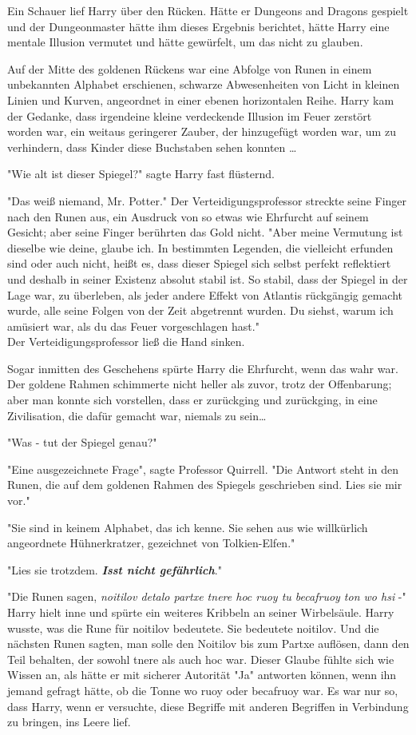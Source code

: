 {Ein Schauer lief Harry über den Rücken. Hätte er Dungeons and Dragons gespielt und der Dungeonmaster hätte ihm dieses Ergebnis berichtet, hätte Harry eine mentale Illusion vermutet und hätte gewürfelt, um das nicht zu glauben.

Auf der Mitte des goldenen Rückens war eine Abfolge von Runen in einem unbekannten Alphabet erschienen, schwarze Abwesenheiten von Licht in kleinen Linien und Kurven, angeordnet in einer ebenen horizontalen Reihe. Harry kam der Gedanke, dass irgendeine kleine verdeckende Illusion im Feuer zerstört worden war, ein weitaus geringerer Zauber, der hinzugefügt worden war, um zu verhindern, dass Kinder diese Buchstaben sehen konnten …

"Wie alt ist dieser Spiegel?" sagte Harry fast flüsternd.

"Das weiß niemand, Mr. Potter." Der Verteidigungsprofessor streckte seine Finger nach den Runen aus, ein Ausdruck von so etwas wie Ehrfurcht auf seinem Gesicht; aber seine Finger berührten das Gold nicht. "Aber meine Vermutung ist dieselbe wie deine, glaube ich. In bestimmten Legenden, die vielleicht erfunden sind oder auch nicht, heißt es, dass dieser Spiegel sich selbst perfekt reflektiert und deshalb in seiner Existenz absolut stabil ist. So stabil, dass der Spiegel in der Lage war, zu überleben, als jeder andere Effekt von Atlantis rückgängig gemacht wurde, alle seine Folgen von der Zeit abgetrennt wurden. Du siehst, warum ich amüsiert war, als du das Feuer vorgeschlagen hast."\\ Der Verteidigungsprofessor ließ die Hand sinken.

Sogar inmitten des Geschehens spürte Harry die Ehrfurcht, wenn das wahr war. Der goldene Rahmen schimmerte nicht heller als zuvor, trotz der Offenbarung; aber man konnte sich vorstellen, dass er zurückging und zurückging, in eine Zivilisation, die dafür gemacht war, niemals zu sein…

"Was - tut der Spiegel genau?"

"Eine ausgezeichnete Frage", sagte Professor Quirrell. "Die Antwort steht in den Runen, die auf dem goldenen Rahmen des Spiegels geschrieben sind. Lies sie mir vor."

"Sie sind in keinem Alphabet, das ich kenne. Sie sehen aus wie willkürlich angeordnete Hühnerkratzer, gezeichnet von Tolkien-Elfen."

"Lies sie trotzdem. \textbf{\emph{Isst nicht gefährlich}}."

"Die Runen sagen, \emph{noitilov detalo partxe tnere hoc ruoy tu becafruoy ton wo hsi} -" Harry hielt inne und spürte ein weiteres Kribbeln an seiner Wirbelsäule. Harry wusste, was die Rune für noitilov bedeutete. Sie bedeutete noitilov. Und die nächsten Runen sagten, man solle den Noitilov bis zum Partxe auflösen, dann den Teil behalten, der sowohl tnere als auch hoc war. Dieser Glaube fühlte sich wie Wissen an, als hätte er mit sicherer Autorität "Ja" antworten können, wenn ihn jemand gefragt hätte, ob die Tonne wo ruoy oder becafruoy war. Es war nur so, dass Harry, wenn er versuchte, diese Begriffe mit anderen Begriffen in Verbindung zu bringen, ins Leere lief.

}
